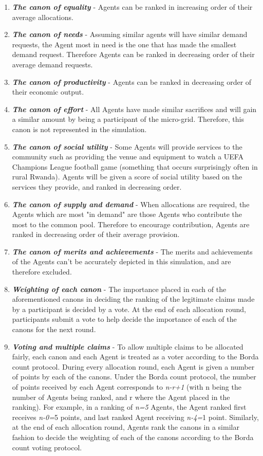 \begin{enumerate}
	\item \textbf{\textit{The canon of equality}} - Agents can be ranked in increasing order of their average allocations.
	\item \textbf{\textit{The canon of needs}} - Assuming similar agents will have similar demand requests, the Agent most in need is the one that has made the smallest demand request. Therefore Agents can be ranked in decreasing order of their average demand requests.
	\item \textbf{\textit{The canon of productivity}} - Agents can be ranked in decreasing order of their economic output.
	\item \textbf{\textit{The canon of effort}} - All Agents have made similar sacrifices and will gain a similar amount by being a participant of the micro-grid. Therefore, this canon is not represented in the simulation.
	\item \textbf{\textit{The canon of social utility}} - Some Agents will provide services to the community such as providing the venue and equipment to watch a UEFA Champions League football game (something that occurs surprisingly often in rural Rwanda). Agents will be given a score of social utility based on the services they provide, and ranked in decreasing order.
	\item \textbf{\textit{The canon of supply and demand}} - When allocations are required, the Agents which are most "in demand" are those Agents who contribute the most to the common pool. Therefore to encourage contribution, Agents are ranked in decreasing order of their average provision.
	\item \textbf{\textit{The canon of merits and achievements}} - The merits and achievements of the Agents can't be accurately depicted in this simulation, and are therefore excluded.
	\item \textbf{\textit{Weighting of each canon}} - The importance placed in each of the aforementioned canons in deciding the ranking of the legitimate claims made by a participant is decided by a vote. At the end of each allocation round, participants submit a vote to help decide the importance of each of the canons for the next round.
	\item \textbf{\textit{Voting and multiple claims}} - To allow multiple claims to be allocated fairly, each canon and each Agent is treated as a voter according to the Borda count protocol. During every allocation round, each Agent is given a number of points by each of the canons. Under the Borda count protocol, the number of points received by each Agent corresponds to \textit{n-r+1} (with n being the number of Agents being ranked, and r where the Agent placed in the ranking). For example, in a ranking of \textit{n=5} Agents, the Agent ranked first receives \textit{n-0=}5 points, and last ranked Agent receiving \textit{n-4=}1 point. Similarly, at the end of each allocation round, Agents rank the canons in a similar fashion to decide the weighting of each of the canons according to the Borda count voting protocol.
\end{enumerate}


